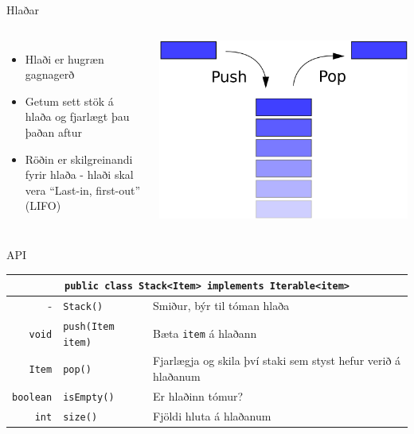 \documentclass{beamer}
\begin{document}
\begin{frame}{Hlaðar}
	\begin{columns}[c]
		\begin{itemize}
			\item Hlaði er hugræn gagnagerð
			\item Getum sett stök á hlaða og fjarlægt þau þaðan aftur
			\item Röðin er skilgreinandi fyrir hlaða - hlaði skal vera ``Last-in, first-out'' (LIFO)
		\end{itemize}
		\includegraphics[width=\linewidth]{Pics/stack}
	\end{columns}
\end{frame}

\begin{frame}{API}
	\begin{center}
		\begin{tabularx}{\textwidth}{rlX}
			\toprule
			\multicolumn{3}{c}{\texttt{public class Stack<Item> implements Iterable<item>}}                             \\
			\midrule
			-                & \texttt{Stack()}         & Smiður, býr til tóman hlaða                                   \\
			\texttt{void}    & \texttt{push(Item item)} & Bæta \texttt{item} á hlaðann                                  \\
			\texttt{Item}    & \texttt{pop()}           & Fjarlægja og skila því staki sem styst hefur verið á hlaðanum \\
			\texttt{boolean} & \texttt{isEmpty()}       & Er hlaðinn tómur?                                             \\
			\texttt{int}     & \texttt{size()}          & Fjöldi hluta á hlaðanum                                       \\
			\bottomrule
		\end{tabularx}
	\end{center}
\end{frame}
\end{document}
